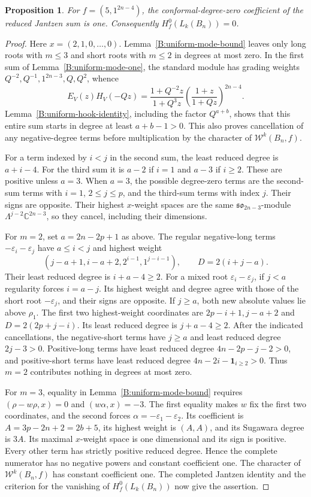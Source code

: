 \documentclass[11pt,a4paper]{amsart}
\numberwithin{equation}{section}
\newtheorem{proposition}[theorem]{Proposition}
\theoremstyle{definition}
\theoremstyle{remark}
\begin{document}
\begin{proposition}\label{B:uniform-five-hook}
For $f=(5,1^{2n-4})$, the conformal-degree-zero coefficient of the
reduced Jantzen sum is one. Consequently $H_f^0(L_k(B_n))=0$.
\end{proposition}
\begin{proof}
Here $x=(2,1,0,\ldots,0)$.
Lemma~\ref{B:uniform-mode-bound} leaves only long roots with
$m\leq3$ and short roots with $m\leq2$ in degrees at most zero.
In the first sum of Lemma~\ref{B:uniform-mode-one}, the standard
module has grading weights $Q^{-2},Q^{-1},1^{2n-3},Q,Q^2$, whence
$$
 E_V(z)H_V(-Qz)
 =\frac{1+Q^{-2}z}{1+Q^3z}
       \left(\frac{1+z}{1+Qz}\right)^{2n-4}.
$$
Lemma~\ref{B:uniform-hook-identity}, including the factor $Q^{a+b}$,
shows that this entire sum starts in degree at least $a+b-1>0$.
This also proves cancellation of any negative-degree terms before
multiplication by the character of $\mathcal W^k(B_n,f)$.

For a term indexed by $i<j$ in the second sum, the least reduced
degree is $a+i-4$. For the third sum it is $a-2$ if $i=1$ and
$a-3$ if $i\geq2$. These are positive unless $a=3$.
When $a=3$, the possible degree-zero terms are the second-sum terms
with $i=1$, $2\leq j\leq p$, and the third-sum terms with index $j$.
Their signs are opposite. Their highest $x$-weight spaces are the
same $\mathfrak{so}_{2n-3}$-module $\Lambda^{j-2}\mathbb C^{2n-3}$,
so they cancel, including their dimensions.

For $m=2$, set $a=2n-2p+1$ as above.
The regular negative-long terms $-\varepsilon_i-\varepsilon_j$
have $a\leq i<j$ and highest weight
$$
 (j-a+1,i-a+2,2^{i-1},1^{j-i-1}),\qquad D=2(i+j-a).
$$
Their least reduced degree is $i+a-4\geq2$.
For a mixed root $\varepsilon_i-\varepsilon_j$, if $j<a$ regularity
forces $i=a-j$. Its highest weight and degree agree with those of
the short root $-\varepsilon_j$, and their signs are opposite.
If $j\geq a$, both new absolute values lie above $\rho_1$. The
first two highest-weight coordinates are $2p-i+1,j-a+2$ and
$D=2(2p+j-i)$. Its least reduced degree is $j+a-4\geq2$.
After the indicated cancellations, the negative-short terms have
$j\geq a$ and least reduced degree $2j-3>0$.
Positive-long terms have least reduced degree
$4n-2p-j-2>0$, and positive-short terms have least reduced degree
$4n-2i-\mathbf1_{i\geq2}>0$. Thus $m=2$ contributes nothing in
degrees at most zero.

For $m=3$, equality in Lemma~\ref{B:uniform-mode-bound} requires
$(\rho-w\rho,x)=0$ and $(w\alpha,x)=-3$.
The first equality makes $w$ fix the first two coordinates, and the
second forces $\alpha=-\varepsilon_1-\varepsilon_2$.
Its coefficient is $A=3p-2n+2=2b+5$, its highest weight is $(A,A)$,
and its Sugawara degree is $3A$. Its maximal $x$-weight space is
one dimensional and its sign is positive. Every other term has
strictly positive reduced degree. Hence the complete numerator
has no negative powers and constant coefficient one.
The character of $\mathcal W^k(B_n,f)$ has constant coefficient
one. The completed Jantzen identity and the criterion for the vanishing of $H_f^0(L_k(B_n))$ now give
the assertion.
\end{proof}
\end{document}
